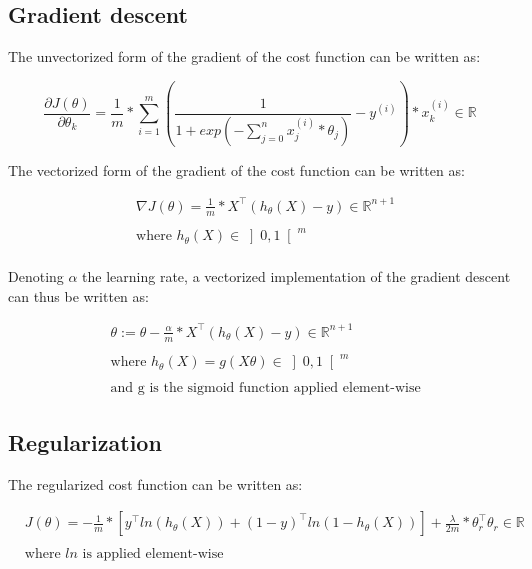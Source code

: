 \documentclass[a4paper, 12pt]{article}
\begin{document}
\subsection{Gradient descent}

The unvectorized form of the gradient of the cost function can be written as:

\begin{equation}
\frac{\partial J(\theta)}{\partial \theta_{k}} = \frac{1}{m} * \sum_{i=1}^{m} \left( \frac{1}{1+exp(-\sum_{j=0}^{n} x_{j}^{(i)}*\theta_{j})} - y^{(i)} \right) * x_{k}^{(i)} \in \mathbb{R}
\end{equation}

The vectorized form of the gradient of the cost function can be written as:

\begin{align*}
& \nabla J(\theta) = \frac{1}{m} * X^{\top}\left( h_{\theta}(X)-y \right) \in \mathbb{R}^{n+1} \\
& \\
& \text{where } h_{\theta}(X) \in \left]0, 1 \right[^{m} \\
\end{align*}

Denoting $\alpha$ the learning rate, a vectorized implementation of the gradient descent can thus be written as:

\begin{align*}
& \theta := \theta - \frac{\alpha}{m} *X^{\top}\left( h_{\theta}(X)-y \right) \in \mathbb{R}^{n+1} \\
& \\
& \text{where } h_{\theta}(X) = g(X\theta ) \in \left] 0, 1 \right[^{m} \\
& \\
& \text{and g is the sigmoid function applied element-wise}
\end{align*}

\subsection{Regularization}

The regularized cost function can be written as:

\begin{align*}
& J(\theta) = -\frac{1}{m} * \left[y^{\top} ln(h_{\theta}(X)) + (1-y)^{\top}ln(1-h_{\theta}(X)) \right] +\frac{\lambda}{2m}*\theta_{r}^{\top}\theta_{r}  \in \mathbb{R} \\
& \\
& \text{where } ln \text{ is applied element-wise} 
\end{align*}
\end{document}
